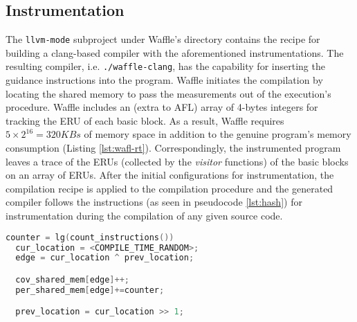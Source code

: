 \subsection{Instrumentation}
\label{subsec:inst}


The \texttt{llvm-mode} subproject under Waffle's directory contains the recipe for building a clang-based compiler with the aforementioned instrumentations. The resulting compiler, i.e. \texttt{./waffle-clang}, has the capability for inserting the guidance instructions into the program. Waffle initiates the compilation by locating the shared memory to pass the measurements out of the execution's procedure. Waffle includes an (extra to AFL) array of 4-bytes integers for tracking the ERU of each basic block. As a result, Waffle requires $5\times2^{16}=320KBs$ of memory space in addition to the genuine program's memory consumption (Listing \ref{lst:wafl-rt}). Correspondingly, the instrumented program leaves a trace of the ERUs (collected by the \textit{visitor} functions) of the basic blocks on an array of ERUs. After the initial configurations for instrumentation, the compilation recipe is applied to the compilation procedure and the generated compiler follows the instructions (as seen in pseudocode \ref{lst:hash}) for instrumentation during the compilation of any given source code.

\begin{minipage}{\textwidth}
\begin{lstlisting}[language=C++,style=CodeStyle,label={lst:hash},caption={Select element and update in shared\_mem}]
  counter = lg(count_instructions())
  cur_location = <COMPILE_TIME_RANDOM>;
  edge = cur_location ^ prev_location;

  cov_shared_mem[edge]++;
  per_shared_mem[edge]+=counter;

  prev_location = cur_location >> 1;
\end{lstlisting}
\end{minipage}
  

  


